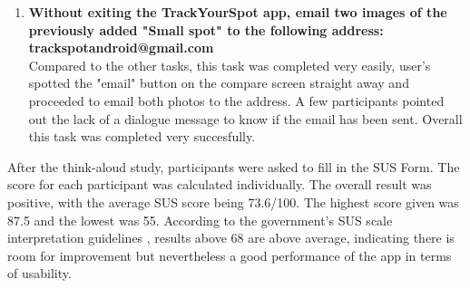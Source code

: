 \begin{enumerate}
    \item \textbf{Without exiting the TrackYourSpot app, email two images of the previously added "Small spot" to the following address: trackspotandroid@gmail.com}
    \\ Compared to the other tasks, this task was completed very easily, user's spotted the "email" button on the compare screen straight away and proceeded to email both photos to the address. A few participants pointed out the lack of a dialogue message to know if the email has been sent. Overall this task was completed very succesfully.
\end{enumerate}

After the think-aloud study, participants were asked to fill in the SUS Form. The score for each participant was calculated individually. The overall result was positive, with the average SUS score being 73.6/100. The highest score given was 87.5 and the lowest was 55. According to the government's SUS scale interpretation guidelines \cite{affairs_2013}, results above 68 are above average, indicating there is room for improvement but nevertheless a good performance of the app in terms of usability.

